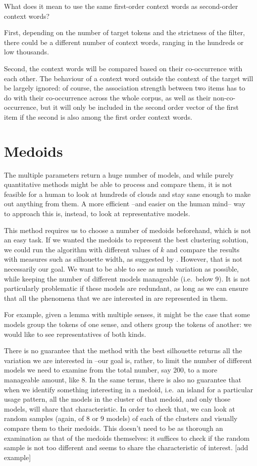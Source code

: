 \documentclass[
]{book}
\begin{document}
What does it mean to use the same first-order context words as second-order context words?

First, depending on the number of target tokens and the strictness of the filter, there could be a different number of context words, ranging in the hundreds or low thousands.

Second, the context words will be compared based on their co-occurrence with each other. The behaviour of a context word outside the context of the target will be largely ignored: of course, the association strength between two items has to do with their co-occurrence across the whole corpus, as well as their non-co-occurrence, but it will only be included in the second order vector of the first item if the second is also among the first order context words.

\hypertarget{medoids}{%
\section{Medoids}\label{medoids}}

The multiple parameters return a huge number of models, and while purely quantitative methods might
be able to process and compare them, it is not feasible for a human to look at hundreds of clouds
and stay sane enough to make out anything from them. A more efficient --and easier on the human mind--
way to approach this is, instead, to look at representative models.

This method requires us to choose a number of medoids beforehand, which is not an easy
task. If we wanted the medoids to represent the best clustering solution, we could run
the algorithm with different values of \(k\) and compare the results with measures such
as silhouette width, as suggested by \textcite{levshina_2015}. However, that is not
necessarily our goal. We want to be able to see as much variation as possible, while keeping
the number of different models manageable (i.e.~below 9). It is not particularly problematic
if these models are redundant, as long as we can ensure that all the phenomena that we
are interested in are represented in them.

For example, given a lemma with multiple senses, it might be the case that some models
group the tokens of one sense, and others group the tokens of another: we would like to see
representatives of both kinds.

There is no guarantee that the method with the best silhouette returns all the variation we
are interested in --our goal is, rather, to limit the number of different models we need to
examine from the total number, say 200, to a more manageable amount, like 8.
In the same terms, there is also no guarantee that when we identify something interesting
in a medoid, i.e.~an island for a particular usage pattern, all the models in the cluster of
that medoid, and only those models, will share that characteristic. In order to check that,
we can look at random samples (again, of 8 or 9 models) of each of the clusters and
visually compare them to their medoids. This doesn't need to be as thorough an examination as
that of the medoids themselves: it suffices to check if the random sample is not too different
and seems to share the characteristic of interest. {[}add example{]}
\end{document}
